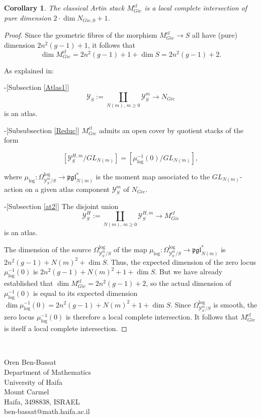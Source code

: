 \documentclass[11pt]{amsart}
\theoremstyle{plain}
\numberwithin{equation}{section}
\theoremstyle{definition}
\theoremstyle{plain}
\newtheorem{Cor}[Def]{Corollary}
\begin{document}
\begin{Cor} \label{LCI}
The classical Artin stack $M^{cl}_{Gie}$ is a local complete intersection of pure dimension $2\cdot \dim N_{Gie, 0}+1$.
\end{Cor}

\begin{proof}
Since the geometric fibres of the morphism $M^{cl}_{Gie} \to S$ all have (pure) dimension $2n^2(g-1)+1$, it follows that
\[
\dim M^{cl}_{Gie} = 2n^2(g-1) + 1 + \dim S = 2n^2(g-1) + 2.
\]

As explained in:

-[Subsection \ref{Atlas1}]\[
\mathcal{Y}_S := \coprod_{N(m),\, m \geq 0} \mathcal{Y}^{m}_S \longrightarrow N_{Gie}
\]
is an atlas. 

-[Subsubsection \ref{Reduc}] $M^{cl}_{Gie}$ admits an open cover by quotient stacks of the form 

$$[\mathcal Y^{H, m}_S/GL_{N(m)}]=[\mu_{\log}^{-1}(0)/GL_{N(m)}],$$ 

where $\mu_{\log} : \Omega^{\log}_{\mathcal{Y}^m_S/S} \to \mathfrak{pgl}_{N(m)}^*$ is the moment map associated to the $GL_{N(m)}$-action on a given atlas component $\mathcal{Y}^m_S$ of $N_{Gie}$.

-[Subsection \ref{at2}] The disjoint union
\[
\mathcal{Y}^H_S := \coprod_{N(m),\, m \geq 0} \mathcal{Y}^{H,m}_S \longrightarrow M^{cl}_{Gie}
\]
is an atlas. 

The dimension of the source $\Omega^{\log}_{\mathcal{Y}^m_S/S}$ of the map $\mu_{\log} : \Omega^{\log}_{\mathcal{Y}^m_S/S} \to \mathfrak{pgl}_{N(m)}^*$ is $2n^2(g-1) + N(m)^2 + \dim S$. Thus, the expected dimension of the zero locus $\mu_{\log}^{-1}(0)$ is $2n^2(g-1) + N(m)^2 + 1 + \dim S$. But we have already established that $\dim M^{cl}_{Gie} = 2n^2(g-1) + 2$, so the actual dimension of $\mu_{\log}^{-1}(0)$ is equal to its expected dimension $\dim \mu_{\log}^{-1}(0) = 2n^2(g-1) + N(m)^2 + 1 + \dim S$. Since $\Omega^{\log}_{\mathcal{Y}^m_S/S}$ is smooth, the zero locus $\mu_{\log}^{-1}(0)$ is therefore a local complete intersection. It follows that $M^{cl}_{Gie}$ is itself a local complete intersection.
\end{proof}

\

\nocite{*}



\noindent
Oren Ben-Bassat \\
Department of Mathematics \\
University of Haifa \\
Mount Carmel \\
Haifa, 3498838, ISRAEL\\
ben-bassat@math.haifa.ac.il\\
\end{document}
